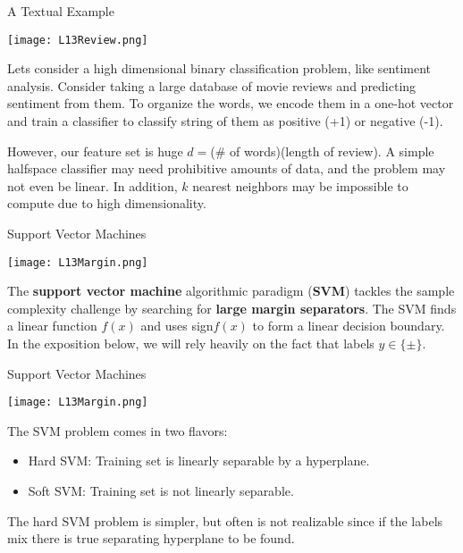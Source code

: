 \documentclass[10pt, table, dvipsnames,xcdraw]{beamer}
\begin{document}
\begin{frame}[fragile]{A Textual Example}
  \begin{minipage}[t][0.3\textheight][t]{\textwidth}
	\centering \texttt{[image: L13Review.png]} 
  \end{minipage}
  \vfill
\begin{minipage}[t][0.7\textheight][t]{\textwidth}
Lets consider a high dimensional binary classification problem, like sentiment analysis. Consider taking a large database of movie reviews and predicting sentiment from them. To organize the words, we encode them in a one-hot vector and train a classifier to classify string of them as positive (+1) or negative (-1). \newline

\pause However, our feature set is huge $d=$($\#$ of words)(length of review). A simple halfspace classifier may need prohibitive amounts of data, and the problem may not even be linear. \pause In addition, $k$ nearest neighbors may be impossible to compute due to high dimensionality. 
\end{minipage}
\end{frame}





\begin{frame}[fragile]{Support Vector Machines}
  \begin{minipage}[t][0.5\textheight][t]{\textwidth}
	\centering \texttt{[image: L13Margin.png]}
  \end{minipage}
  \vfill
\begin{minipage}[t][0.5\textheight][t]{\textwidth}
The \textbf{support vector machine} algorithmic paradigm (\textbf{SVM}) tackles the sample complexity challenge by searching for \textbf{large margin separators}. The SVM finds a linear function $f(x)$ and uses sign$f(x)$ to form a linear decision boundary. In the exposition below, we will rely heavily on the fact that labels $y\in \{\pm\}$.
\end{minipage}
\end{frame}


\begin{frame}[fragile]{Support Vector Machines}
  \begin{minipage}[t][0.5\textheight][t]{\textwidth}
	\centering \texttt{[image: L13Margin.png]}
  \end{minipage}
  \vfill
\begin{minipage}[t][0.5\textheight][t]{\textwidth}
The SVM problem comes in two flavors:
\begin{itemize}
\item[] Hard SVM: Training set is linearly separable by a hyperplane.
\item[] Soft SVM: Training set is not linearly separable. 
\end{itemize}
The hard SVM problem is simpler, but often is not realizable since if the labels mix there is true separating hyperplane to be found.
\end{minipage}
\end{frame}
\end{document}

